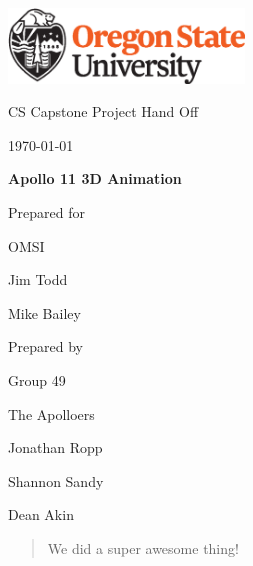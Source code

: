 \documentclass[onecolumn, draftclsnofoot,10pt, compsoc]{IEEEtran}
\def \CapstoneTeamName{		    The Apolloers}
\def \CapstoneTeamNumber{		49}
\def \GroupMemberOne{			Jonathan Ropp}
\def \GroupMemberTwo{			Shannon Sandy}
\def \GroupMemberThree{			Dean Akin}
\def \CapstoneProjectName{		Apollo 11 3D Animation}
\def \CapstoneSponsorCompany{	OMSI}
\def \CapstoneSponsorPersona{	Jim Todd}
\def \CapstoneSponsorPersonb{	Mike Bailey}
\def \DocType{		
				Project Hand Off
				}
\newcommand{\NameSigPair}[1]{\par
\makebox[2.75in][r]{#1} \hfil 	\makebox[3.25in]{\makebox[2.25in]{\hrulefill} \hfill		\makebox[.75in]{\hrulefill}}
\par\vspace{-12pt} \textit{\tiny\noindent
\makebox[2.75in]{} \hfil		\makebox[3.25in]{\makebox[2.25in][r]{Signature} \hfill	\makebox[.75in][r]{Date}}}}
\renewcommand{\NameSigPair}[1]{#1}
\begin{document}
\begin{titlepage}
    \begin{singlespace}
        \hfill 
        \includegraphics[height=2cm]{OSU_horizontal_2C_O_over_B.eps}   
        \par\vspace{.2in}
        \centering
        \scshape{
            \huge CS Capstone \DocType \par
            {\large\today}\par
            \vspace{.5in}
            \textbf{\Huge\CapstoneProjectName}\par
            \vfill
            {\large Prepared for}\par
            \Huge \CapstoneSponsorCompany\par
            \vspace{5pt}
            {\Large\NameSigPair{\CapstoneSponsorPersona}\par}
            {\Large\NameSigPair{\CapstoneSponsorPersonb}\par}
            {\large Prepared by }\par
            Group\CapstoneTeamNumber\par
            \CapstoneTeamName\par 
            \vspace{5pt}
            {\Large
                \NameSigPair{\GroupMemberOne}\par
                \NameSigPair{\GroupMemberTwo}\par
                \NameSigPair{\GroupMemberThree}\par
            }
            \vspace{20pt}
        }
        \begin{abstract}
    
We did a super awesome thing! 

        \end{abstract}     
    \end{singlespace}
\end{titlepage}
\newpage
{}
\tableofcontents
\end{document}
